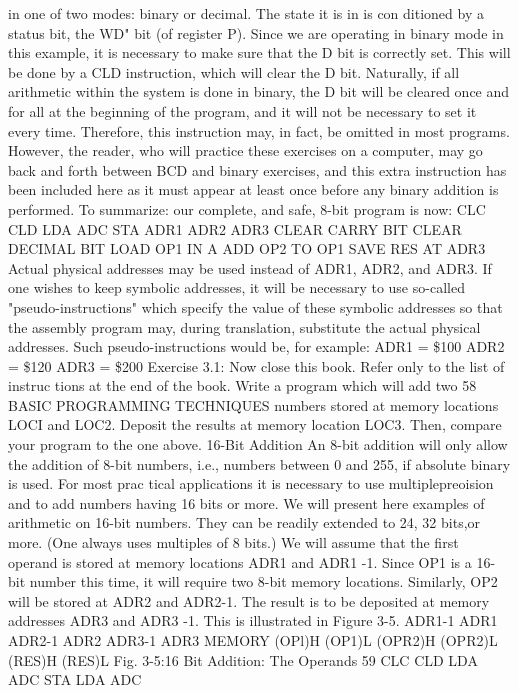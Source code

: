 \documentclass{book}
\begin{document}
in one of two modes: binary or decimal. The state it is in is con
ditioned by a status bit, the WD" bit (of register P). Since we are
operating in binary mode in this example, it is necessary to make
sure that the D bit is correctly set. This will be done by a CLD
instruction, which will clear the D bit. Naturally, if all arithmetic
within the system is done in binary, the D bit will be cleared once
and for all at the beginning of the program, and it will not be
necessary to set it every time. Therefore, this instruction may, in
fact, be omitted in most programs. However, the reader, who will
practice these exercises on a computer, may go back and forth
between BCD and binary exercises, and this extra instruction has
been included here as it must appear at least once before any
binary addition is performed.
To summarize: our complete, and safe, 8-bit program is now:
CLC
CLD
LDA
ADC
STA
ADR1
ADR2
ADR3
CLEAR CARRY BIT
CLEAR DECIMAL BIT
LOAD OP1 IN A
ADD OP2 TO OP1
SAVE RES AT ADR3
Actual physical addresses may be used instead of ADR1, ADR2,
and ADR3. If one wishes to keep symbolic addresses, it will be
necessary to use so-called "pseudo-instructions" which specify the
value of these symbolic addresses so that the assembly program
may, during translation, substitute the actual physical addresses.
Such pseudo-instructions would be, for example:
ADR1 = \$100
ADR2 = \$120
ADR3 = \$200
Exercise 3.1: Now close this book. Refer only to the list of instruc
tions at the end of the book. Write a program which will add two
58
BASIC PROGRAMMING TECHNIQUES
numbers stored at memory locations LOCI and LOC2. Deposit the
results at memory location LOC3. Then, compare your program to
the one above.
16-Bit Addition
An 8-bit addition will only allow the addition of 8-bit numbers, i.e.,
numbers between 0 and 255, if absolute binary is used. For most prac
tical applications it is necessary to use multiplepreoision and to add
numbers having 16 bits or more. We will present here examples of
arithmetic on 16-bit numbers. They can be readily extended to 24,
32 bits,or more. (One always uses multiples of 8 bits.) We will assume
that the first operand is stored at memory locations ADR1 and
ADR1 -1. Since OP1 is a 16-bit number this time, it will require two
8-bit memory locations. Similarly, OP2 will be stored at ADR2 and
ADR2-1. The result is to be deposited at memory addresses ADR3
and ADR3 -1. This is illustrated in Figure 3-5.
ADR1-1
ADR1
ADR2-1
ADR2
ADR3-1
ADR3
MEMORY
(OPl)H
(OP1)L
(OPR2)H
(OPR2)L
(RES)H
(RES)L
Fig. 3-5:16 Bit Addition: The Operands
59
CLC
CLD
LDA
ADC
STA
LDA
ADC
\end{document}

